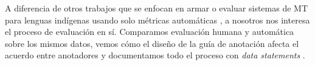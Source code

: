 A diferencia de otros trabajos que se enfocan en armar o evaluar sistemas de MT
para lenguas indígenas usando solo métricas automáticas
\citep{ebrahimi2023findings,degibert2025findings}, a nosotros nos interesa el
proceso de evaluación en sí. Comparamos evaluación humana y automática
sobre los mismos datos, vemos cómo el diseño de la guía de anotación afecta el
acuerdo entre anotadores y documentamos todo el proceso con \emph{data statements}
\citep{bender2018data}.

